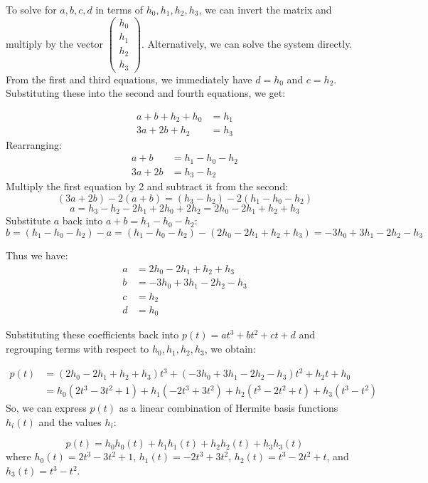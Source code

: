 \documentclass{article}
\begin{document}
To solve for \(a, b, c, d\) in terms of \(h_0, h_1, h_2, h_3\), we can invert the matrix and multiply by the vector \(\begin{pmatrix} h_0 \\ h_1 \\ h_2 \\ h_3 \end{pmatrix}\).  Alternatively, we can solve the system directly. From the first and third equations, we immediately have \(d = h_0\) and \(c = h_2\). Substituting these into the second and fourth equations, we get:

\begin{align*}
a + b + h_2 + h_0 &= h_1 \\
3a + 2b + h_2 &= h_3
\end{align*}
Rearranging:
\begin{align*}
a + b &= h_1 - h_0 - h_2 \\
3a + 2b &= h_3 - h_2
\end{align*}
Multiply the first equation by 2 and subtract it from the second:
\[ (3a + 2b) - 2(a + b) = (h_3 - h_2) - 2(h_1 - h_0 - h_2) \]
\[ a = h_3 - h_2 - 2h_1 + 2h_0 + 2h_2 = 2h_0 - 2h_1 + h_2 + h_3 \]
Substitute \(a\) back into \(a + b = h_1 - h_0 - h_2\):
\[ b = (h_1 - h_0 - h_2) - a = (h_1 - h_0 - h_2) - (2h_0 - 2h_1 + h_2 + h_3) = -3h_0 + 3h_1 - 2h_2 - h_3 \]

Thus we have:
\begin{align*}
a &= 2h_0 - 2h_1 + h_2 + h_3 \\
b &= -3h_0 + 3h_1 - 2h_2 - h_3 \\
c &= h_2 \\
d &= h_0
\end{align*}

Substituting these coefficients back into \(p(t) = a t^3 + b t^2 + c t + d\) and regrouping terms with respect to \(h_0, h_1, h_2, h_3\), we obtain:

\begin{align*}
p(t) &= (2h_0 - 2h_1 + h_2 + h_3)t^3 + (-3h_0 + 3h_1 - 2h_2 - h_3)t^2 + h_2 t + h_0 \\
&= h_0 (2t^3 - 3t^2 + 1) + h_1 (-2t^3 + 3t^2) + h_2 (t^3 - 2t^2 + t) + h_3 (t^3 - t^2)
\end{align*}
So, we can express \(p(t)\) as a linear combination of Hermite basis functions \(h_{i}(t)\) and the values \(h_i\):

\begin{equation}
p(t) = h_0 h_0(t) + h_1 h_1(t) + h_2 h_2(t) + h_3 h_3(t)
\end{equation}
where \(h_0(t) = 2t^3 - 3t^2 + 1\), \(h_1(t) = -2t^3 + 3t^2\), \(h_2(t) = t^3 - 2t^2 + t\), and \(h_3(t) = t^3 - t^2\).
\end{document}
